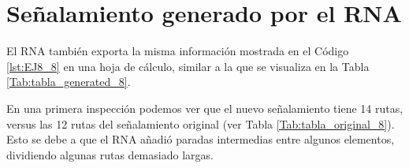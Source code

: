 \section{Señalamiento generado por el RNA}

    El RNA también exporta la misma información mostrada en el Código \ref{lst:EJ8_8} en una hoja de cálculo, similar a la que se visualiza en la Tabla \ref{Tab:tabla_generated_8}.
    
    \begin{table}[H]
        {
        \caption{Tabla de enclavamiento del ejemplo 8 generada por el RNA.}
        \label{Tab:tabla_generated_8}
        \begin{center}      
        \end{center}
     }
    \end{table}
    
    En una primera inspección podemos ver que el nuevo señalamiento tiene 14 rutas, versus las 12 rutas del señalamiento original (ver Tabla \ref{Tab:tabla_original_8}). Esto se debe a que el RNA añadió paradas intermedias entre algunos elementos, dividiendo algunas rutas demasiado largas.
